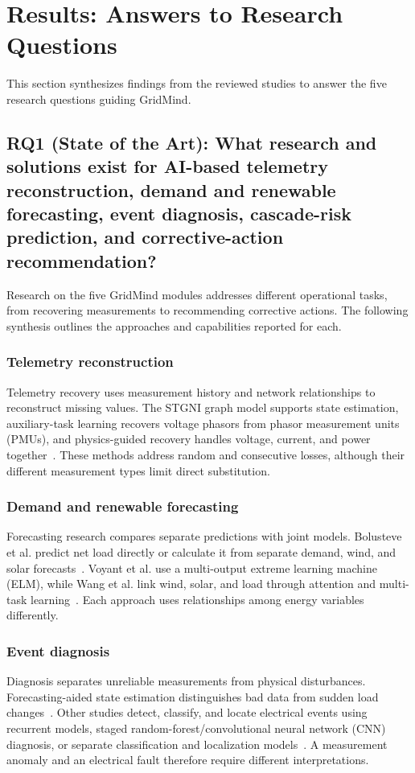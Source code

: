 \section{Results: Answers to Research Questions}
This section synthesizes findings from the reviewed studies to answer the five research questions guiding GridMind.

\subsection{RQ1 (State of the Art): What research and solutions exist for AI-based telemetry reconstruction, demand and renewable forecasting, event diagnosis, cascade-risk prediction, and corrective-action recommendation?}
Research on the five GridMind modules addresses different operational tasks, from recovering measurements to recommending corrective actions. The following synthesis outlines the approaches and capabilities reported for each.

\subsubsection{Telemetry reconstruction}
Telemetry recovery uses measurement history and network relationships to reconstruct missing values. The STGNI graph model supports state estimation, auxiliary-task learning recovers voltage phasors from phasor measurement units (PMUs), and physics-guided recovery handles voltage, current, and power together~\cite{S28,N01,S29}. These methods address random and consecutive losses, although their different measurement types limit direct substitution.

\subsubsection{Demand and renewable forecasting}
Forecasting research compares separate predictions with joint models. Bolusteve et al. predict net load directly or calculate it from separate demand, wind, and solar forecasts~\cite{S25}. Voyant et al. use a multi-output extreme learning machine (ELM), while Wang et al. link wind, solar, and load through attention and multi-task learning~\cite{S20,S24}. Each approach uses relationships among energy variables differently.

\subsubsection{Event diagnosis}
Diagnosis separates unreliable measurements from physical disturbances. Forecasting-aided state estimation distinguishes bad data from sudden load changes~\cite{S18}. Other studies detect, classify, and locate electrical events using recurrent models, staged random-forest/convolutional neural network (CNN) diagnosis, or separate classification and localization models~\cite{S11,S16,S14}. A measurement anomaly and an electrical fault therefore require different interpretations.

